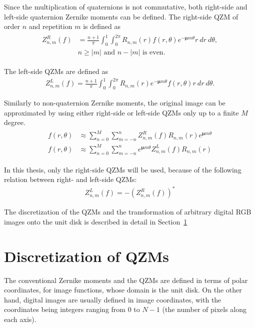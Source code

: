 Since the multiplication of quaternions is not commutative, both right-side and left-side quaternion Zernike moments can be defined. The right-side QZM of order $n$ and repetition $m$ is defined as
\begin{gather}
  \begin{split}
  Z_{n,m}^R(f) &= \frac{n + 1}{\pi}\int_0^1\int_0^{2\pi}R_{n,m}(r)f(r,\theta)e^{-\bm{\mu}m\theta}r\ dr\ d\theta, \\
  &n \geq |m| \text{  and  } n - |m| \text{  is even.}
  \end{split}
  \label{eq:QZRM}
\end{gather}

The left-side QZMs are defined as 
\begin{gather*}
  Z_{n,m}^L(f) = \frac{n + 1}{\pi}\int_0^1\int_0^{2\pi}R_{n,m}(r)e^{-\bm{\mu}m\theta}f(r,\theta)r\ dr\ d\theta.
\end{gather*}

Similarly to non-quaternion Zernike moments, the original image can be approximated by using either right-side or left-side QZMs only up to a finite $M$ degree.
\begin{gather}
\begin{split}
  f(r,\theta) &\approx \sum_{n=0}^{M}\sum_{m=-n}^{n}Z_{n,m}^R(f)R_{n,m}(r)e^{\bm{\mu}m\theta} \\
  f(r,\theta) &\approx \sum_{n=0}^{M}\sum_{m=-n}^{n}e^{\bm{\mu}m\theta}Z_{n,m}^L(f)R_{n,m}(r)
\end{split}\label{eq:qzm_reconstruction}
\end{gather}

In this thesis, only the right-side QZMs will be used, because of the following relation between right- and left-side QZMs:
\begin{gather*}
  Z_{n,m}^L(f) = -(Z_{n,m}^R(f))^{*}
\end{gather*}

The discretization of the QZMs and the transformation of arbitrary digital RGB images onto the unit disk is described in detail in Section~\ref{sec:discretization} 

\section{Discretization of QZMs}\label{sec:discretization}
The conventional Zernike moments and the QZMs are defined in terms of polar coordinates, for image functions, whose domain is the unit disk. On the other hand, digital images are usually defined in image coordinates, with the coordinates being integers ranging from $0$ to $N - 1$ (the number of pixels along each axis).

